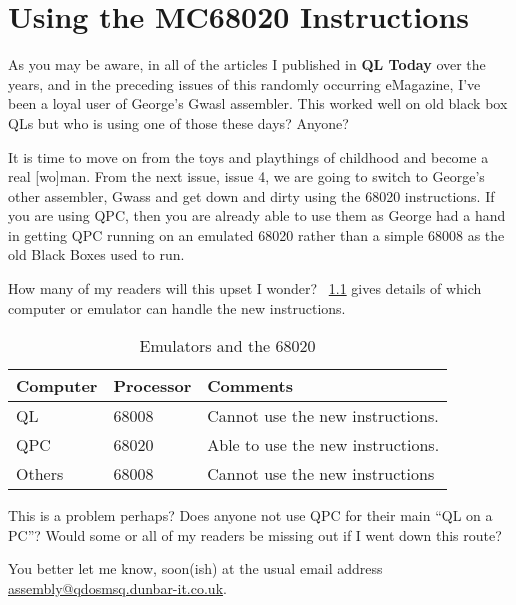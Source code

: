 \chapter{Using the MC68020 Instructions}
As you may be aware, in all of the articles I published in \textbf{QL Today} over the years, and in the preceding issues of this randomly occurring eMagazine, I've been a loyal user of George's Gwasl assembler. This worked well on old black box QLs but who is using one of those these days? Anyone?

It is time to move on from the toys and playthings of childhood and become a real [wo]man. From the next issue, issue 4, we are going to switch to George's other assembler, Gwass and get down and dirty using the 68020 instructions. If you are using QPC, then you are already able to use them as George had a hand in getting QPC running on an emulated 68020 rather than a simple 68008 as the old Black Boxes used to run.

How many of my readers will this upset I wonder? \tablename{~\ref{tab:Emulators68020}} gives details of which computer or emulator can handle the new instructions.

\begin{table}[htbp]
\centering
\begin{tabular}{l l p{}}
\toprule
\textbf{Computer} & \textbf{Processor}&\textbf{Comments}  \\
\midrule
%
QL & 68008 & Cannot use the new instructions.\\
QPC & 68020 & Able to use the new instructions.\\
Others & 68008 & Cannot use the new instructions\\
%
\bottomrule
\end{tabular}
\caption{Emulators and the 68020}
\label{tab:Emulators68020}
\end{table}

This is a problem perhaps? Does anyone not use QPC for their main ``QL on a PC''? Would some or all of my readers be missing out if I went down this route?

You better let me know, soon(ish) at the usual email address \url{assembly@qdosmsq.dunbar-it.co.uk}.
